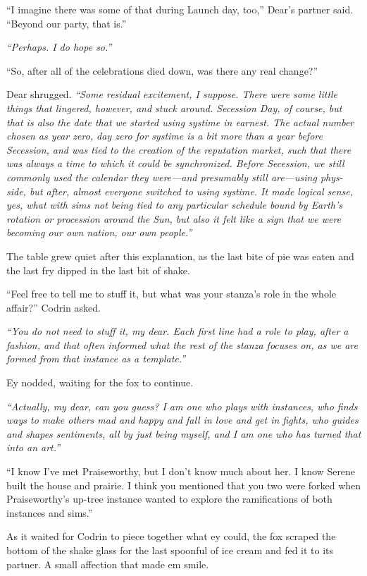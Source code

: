 ``I imagine there was some of that during Launch day, too,'' Dear's partner said. ``Beyond our party, that is.''

\emph{``Perhaps. I do hope so.''}

``So, after all of the celebrations died down, was there any real change?''

Dear shrugged. \emph{``Some residual excitement, I suppose. There were some little things that lingered, however, and stuck around. Secession Day, of course, but that is also the date that we started using systime in earnest. The actual number chosen as year zero, day zero for systime is a bit more than a year before Secession, and was tied to the creation of the reputation market, such that there was always a time to which it could be synchronized. Before Secession, we still commonly used the calendar they were---and presumably still are---using phys-side, but after, almost everyone switched to using systime. It made logical sense, yes, what with sims not being tied to any particular schedule bound by Earth's rotation or procession around the Sun, but also it felt like a sign that we were becoming our own nation, our own people.''}

The table grew quiet after this explanation, as the last bite of pie was eaten and the last fry dipped in the last bit of shake.

``Feel free to tell me to stuff it, but what was your stanza's role in the whole affair?'' Codrin asked.

\emph{``You do not need to stuff it, my dear. Each first line had a role to play, after a fashion, and that often informed what the rest of the stanza focuses on, as we are formed from that instance as a template.''}

Ey nodded, waiting for the fox to continue.

\emph{``Actually, my dear, can you guess? I am one who plays with instances, who finds ways to make others mad and happy and fall in love and get in fights, who guides and shapes sentiments, all by just being myself, and I am one who has turned that into an art.''}

``I know I've met Praiseworthy, but I don't know much about her. I know Serene built the house and prairie. I think you mentioned that you two were forked when Praiseworthy's up-tree instance wanted to explore the ramifications of both instances and sims.''

As it waited for Codrin to piece together what ey could, the fox scraped the bottom of the shake glass for the last spoonful of ice cream and fed it to its partner. A small affection that made em smile.

